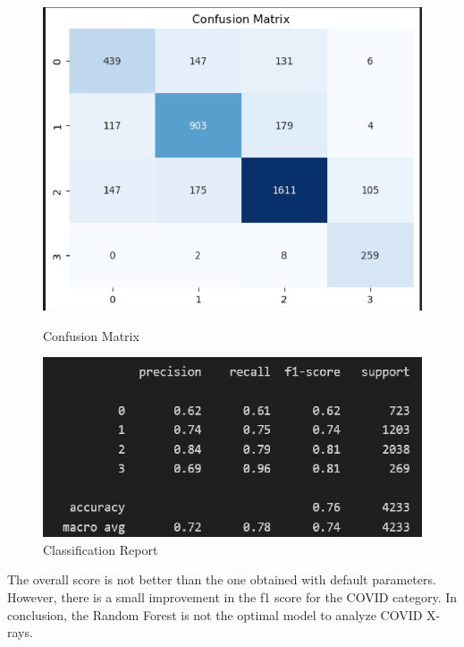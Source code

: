 \documentclass{article}
\begin{document}
\begin{figure}[H]
    \centering
    \begin{minipage}[t]{0.48\textwidth}
        \centering
        \includegraphics[width=\linewidth]{CM_RF_opt.png}
        \caption{Confusion Matrix}
        \label{fig:confusion_rf_opt}
    \end{minipage}
    \hfill
    \begin{minipage}[t]{0.48\textwidth}
        \centering
        \includegraphics[width=\linewidth]{CR_RF_opt.png}
        \caption{Classification Report}
        \label{fig:classification_rf_opt}
    \end{minipage}
\end{figure}

The overall score is not better than the one obtained with default parameters. However, there is a small improvement in the f1 score for the COVID category.
In conclusion, the Random Forest is not the optimal model to analyze COVID X-rays. 
\end{document}
